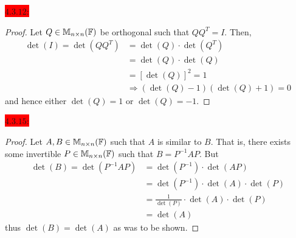 \documentclass{exam}
\begin{document}
  \colorbox{red}{\underline{$4.3.12$}:}
  \begin{solution}
    \begin{proof}
      Let $Q \in \mathbb M_{n \times n}(\mathbb F)$ be orthogonal such that $QQ^{T} = I$. Then, 
      \begin{align*}
        \det(I) = \det(QQ^{T}) &= \det(Q) \cdot \det(Q^{T}) \tag{Thm~4.7} \\
        &= \det(Q) \cdot \det(Q) \tag{Thm~4.8} \\
        &= \left[\det(Q)\right]^{2} = 1 \\
        &\Rightarrow (\det(Q) - 1)(\det(Q) + 1) = 0
      \end{align*}
      and hence either $\det(Q) = 1$ or $\det(Q) = -1$.
    \end{proof}
  \end{solution}

  \colorbox{red}{\underline{$4.3.15$}:}
  \begin{solution}
    \begin{proof}
      Let $A, B \in \mathbb M_{n \times n}(\mathbb F)$ such that $A$ is similar to $B$. That is, there exists some invertible $P \in \mathbb M_{n \times n}(\mathbb F)$ such that $B = P^{-1}AP$. But 
      \begin{align*}
        \det(B) = \det(P^{-1}AP) &= \det(P^{-1}) \cdot \det(AP) \tag{Thm~4.7} \\
        &= \det(P^{-1}) \cdot \det(A) \cdot \det(P) \tag{Thm~4.7} \\
        &= \frac{1}{\det(P)} \cdot \det(A) \cdot \det(P) \tag{Corr. to Thm~4.8} \\
        &= \det(A)
      \end{align*}
      thus $\det(B) = \det(A)$ as was to be shown.
    \end{proof}
  \end{solution}

  \newpage 
\end{document}
